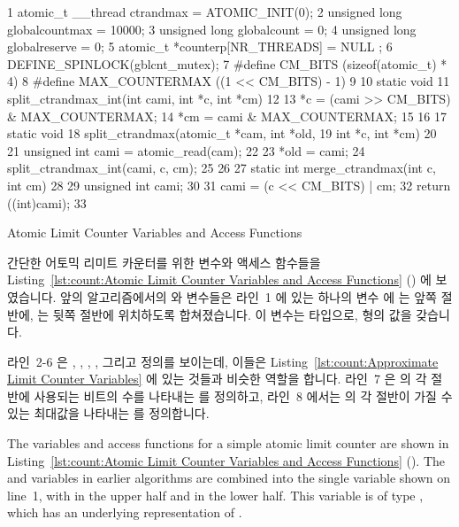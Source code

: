 \begin{listing}[tbp]
{ \scriptsize
\begin{verbbox}
  1 atomic_t __thread ctrandmax = ATOMIC_INIT(0);
  2 unsigned long globalcountmax = 10000;
  3 unsigned long globalcount = 0;
  4 unsigned long globalreserve = 0;
  5 atomic_t *counterp[NR_THREADS] = { NULL };
  6 DEFINE_SPINLOCK(gblcnt_mutex);
  7 #define CM_BITS (sizeof(atomic_t) * 4)
  8 #define MAX_COUNTERMAX ((1 << CM_BITS) - 1)
  9 
 10 static void
 11 split_ctrandmax_int(int cami, int *c, int *cm)
 12 {
 13   *c = (cami >> CM_BITS) & MAX_COUNTERMAX;
 14   *cm = cami & MAX_COUNTERMAX;
 15 }
 16 
 17 static void
 18 split_ctrandmax(atomic_t *cam, int *old,
 19                     int *c, int *cm)
 20 {
 21   unsigned int cami = atomic_read(cam);
 22 
 23   *old = cami;
 24   split_ctrandmax_int(cami, c, cm);
 25 }
 26 
 27 static int merge_ctrandmax(int c, int cm)
 28 {
 29   unsigned int cami;
 30 
 31   cami = (c << CM_BITS) | cm;
 32   return ((int)cami);
 33 }
\end{verbbox}
}
\centering
\theverbbox
\caption{Atomic Limit Counter Variables and Access Functions}
\label{lst:count:Atomic Limit Counter Variables and Access Functions}
\end{listing}

간단한 어토믹 리미트 카운터를 위한 변수와 액세스 함수들을
Listing~\ref{lst:count:Atomic Limit Counter Variables and Access Functions}
() 에 보였습니다.
앞의 알고리즘에서의  와  변수들은 라인~1 에 있는
하나의 변수  에  는 앞쪽 절반에,  는
뒷쪽 절반에 위치하도록 합쳐졌습니다.
이 변수는  타입으로,  형의 값을 갖습니다.

라인~2-6 은 , , ,
, 그리고  정의를 보이는데, 이들은
Listing~\ref{lst:count:Approximate Limit Counter Variables} 에 있는 것들과
비슷한 역할을 합니다.
라인~7 은  의 각 절반에 사용되는 비트의 수를 나타내는
를 정의하고, 라인~8 에서는  의 각 절반이 가질 수 있는
최대값을 나타내는  를 정의합니다.
\iffalse

The variables and access functions for a simple atomic limit counter
are shown in
Listing~\ref{lst:count:Atomic Limit Counter Variables and Access Functions}
().
The  and  variables in earlier algorithms
are combined into the single variable  shown on
line~1, with  in the upper half and  in
the lower half.
This variable is of type , which has an underlying
representation of .

